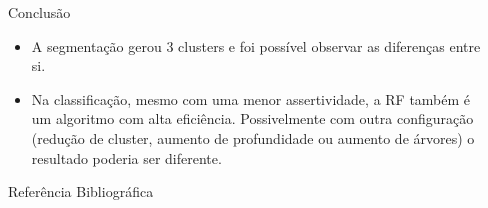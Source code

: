 \documentclass[final,hyperref={pdfpagelabels=false, brazil}]{beamer}
\let\olditem=\item%
\renewcommand{\item}{\olditem \justifying}%
\begin{document}
\begin{frame}[t]
\begin{columns}[t]
\begin{column}{.465\textwidth}
\begin{block}{Conclus\~ao}
\begin{itemize}
\item A segmentação gerou 3 clusters e foi possível observar as diferenças entre si.

\item Na classificação, mesmo com uma menor assertividade, a RF também é um algoritmo com alta eficiência. Possivelmente com outra configuração (redução de cluster, aumento de profundidade ou aumento de árvores) o resultado poderia ser diferente.


\end{itemize}

\end{block}


\begin{block}{Refer\^encia Bibliogr\'afica}
        
\nocite{*} %
\scriptsize{
}

\end{block}









\end{column} %

\begin{column}{.015\textwidth}\end{column} %

\end{columns} %

\end{frame} %
\end{document}
